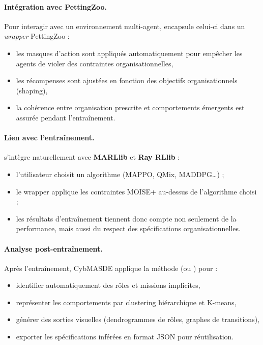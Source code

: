 \paragraph{Intégration avec PettingZoo.}
Pour interagir avec un environnement multi-agent,  encapsule celui-ci dans un \textit{wrapper} PettingZoo :
\begin{itemize}
  \item les masques d'action sont appliqués automatiquement pour empêcher les agents de violer des contraintes organisationnelles,
  \item les récompenses sont ajustées en fonction des objectifs organisationnels (shaping),
  \item la cohérence entre organisation prescrite et comportements émergents est assurée pendant l'entraînement.
\end{itemize}

\paragraph{Lien avec l'entraînement.}
 s'intègre naturellement avec \textbf{MARLlib} et \textbf{Ray RLlib} :
\begin{itemize}
  \item l'utilisateur choisit un algorithme (MAPPO, QMix, MADDPG…) ;
  \item le wrapper  applique les contraintes MOISE+ au-dessus de l'algorithme choisi ;
  \item les résultats d'entraînement tiennent donc compte non seulement de la performance, mais aussi du respect des spécifications organisationnelles.
\end{itemize}

\paragraph{Analyse post-entraînement.}
Après l'entraînement, CybMASDE applique la méthode  (ou ) pour :
\begin{itemize}
  \item identifier automatiquement des rôles et missions implicites,
  \item représenter les comportements par clustering hiérarchique et K-means,
  \item générer des sorties visuelles (dendrogrammes de rôles, graphes de transitions),
  \item exporter les spécifications inférées en format JSON pour réutilisation.
\end{itemize}

